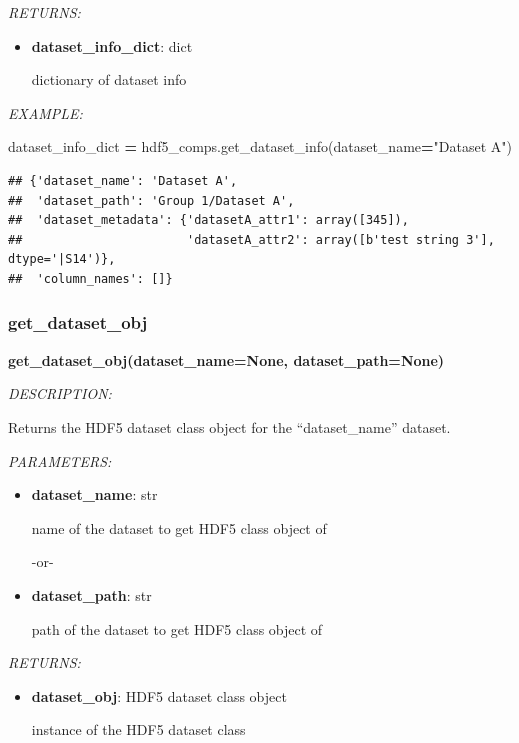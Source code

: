 \documentclass[
]{article}
\newenvironment{Shaded}{\begin{snugshade}}{\end{snugshade}}
\newcommand{\NormalTok}[1]{#1}
\newcommand{\OperatorTok}[1]{\textcolor[rgb]{0.81,0.36,0.00}{\textbf{#1}}}
\newcommand{\StringTok}[1]{\textcolor[rgb]{0.31,0.60,0.02}{#1}}
\begin{document}
\emph{RETURNS:}

\begin{itemize}
\item
  \textbf{dataset\_info\_dict}: dict

  dictionary of dataset info
\end{itemize}

\emph{EXAMPLE:}

\begin{Shaded}
\begin{Highlighting}[]
\NormalTok{dataset_info_dict }\OperatorTok{=}\NormalTok{ hdf5_comps.get_dataset_info(dataset_name}\OperatorTok{=}\StringTok{"Dataset A"}\NormalTok{)}
\end{Highlighting}
\end{Shaded}

\begin{verbatim}
## {'dataset_name': 'Dataset A',
##  'dataset_path': 'Group 1/Dataset A',
##  'dataset_metadata': {'datasetA_attr1': array([345]),
##                       'datasetA_attr2': array([b'test string 3'], dtype='|S14')},
##  'column_names': []}
\end{verbatim}

\hypertarget{get_dataset_obj}{%
\subsubsection{get\_dataset\_obj}\label{get_dataset_obj}}

\textbf{get\_dataset\_obj(dataset\_name=None, dataset\_path=None)}

\emph{DESCRIPTION:}

Returns the HDF5 dataset class object for the ``dataset\_name'' dataset.

\emph{PARAMETERS:}

\begin{itemize}
\item
  \textbf{dataset\_name}: str

  name of the dataset to get HDF5 class object of

  -or-
\item
  \textbf{dataset\_path}: str

  path of the dataset to get HDF5 class object of
\end{itemize}

\emph{RETURNS:}

\begin{itemize}
\item
  \textbf{dataset\_obj}: HDF5 dataset class object

  instance of the HDF5 dataset class
\end{itemize}
\end{document}
